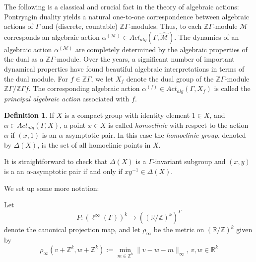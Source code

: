 \documentclass[oneside,english]{amsart}
\theoremstyle{definition}
\newtheorem{defn}[thm]{Definition}
\newcommand{\dT}{\rho_\infty}
\newcommand{\Alg}[2]{\mathit{Act}_{\mathit{alg}}({#1},{#2})}
\begin{document}
The following is a classical and crucial fact in the theory of algebraic actions:
Pontryagin
duality yields a natural one-to-one correspondence between algebraic actions of $\Gamma$ and (discrete, countable) $\mathbb{Z}\Gamma$-modules.
Thus, to each  $\mathbb{Z}\Gamma$-module $\mathcal{M}$  corresponds  an algebraic action  $\alpha^{(\mathcal{M})}\in \Alg{\Gamma}{\widehat{\mathcal{M}}}$. The dynamics of an algebraic action $\alpha^{(\mathcal{M})}$ are completely determined  by the algebraic properties of the dual as a $\mathbb{Z}\Gamma$-module.  Over the years, a significant number of important dynamical properties have found beautiful
algebraic interpretations in terms of the dual module. For $f \in \mathbb{Z}\Gamma$, we let $X_f$ denote the dual group of the $\mathbb{Z}\Gamma$-module $\mathbb{Z}\Gamma / \mathbb{Z}\Gamma f$. The corresponding algebraic action $\alpha^{(f)} \in \Alg{\Gamma}{X_f}$ is called the \emph{principal algebraic action } associated with $f$.


\begin{defn}
If $X$ is a compact group with identity element $1 \in X$, and  $\alpha \in \Alg{\Gamma}{X}$, a point $x \in X$ is called \emph{homoclinic} with respect to the action $\alpha$ if $(x,1)$ is an $\alpha$-asymptotic pair. In this case the \emph{homoclinic group}, denoted by $\Delta(X)$, is the set of all homoclinic points in $X$.
\end{defn}
It is straightforward to check that  $\Delta(X)$ is a $\Gamma$-invariant subgroup and $(x,y)$ is a  an $\alpha$-asymptotic pair if and only if $xy^{-1} \in \Delta(X)$.

We set up some more notation:

Let
\begin{equation}
P:(\ell^\infty(\Gamma))^k \to ((\mathbb{R}/\mathbb{Z})^k)^\Gamma
\end{equation}
denote the canonical projection map,
and  let $\dT$ be the metric on $(\mathbb{R} / \mathbb{Z})^k$ given by
\begin{equation}\label{eq_dT}
\dT \left(v+\mathbb{Z}^k ,w+\mathbb{Z}^k\right):=
\min_{m \in \mathbb{Z}^k}\| v-w -m\|_\infty,~  v,w \in \mathbb{R}^k
\end{equation}
\end{document}
